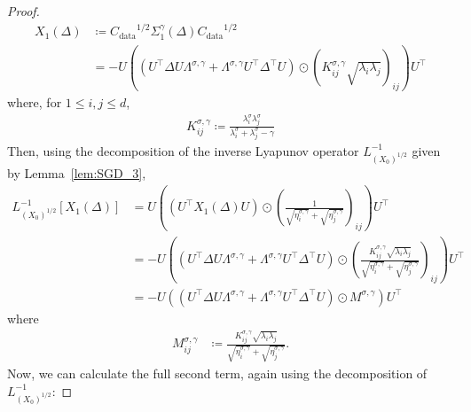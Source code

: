 \documentclass[11pt]{article}
\newcommand{\eqdef}{\coloneqq}
\newcommand{\EE}{\mathbb{E}}
\begin{document}
\begin{proof}
\begin{align*}
X_1(\Delta) &\eqdef{C_\mathrm{data}}^{1/2} \Sigma^\gamma_{1} (\Delta) {C_\mathrm{data}}^{1/2} \\ &= - U \left( \left( U^{\top} \Delta U \Lambda^{\sigma, \gamma} + \Lambda^{\sigma, \gamma} U^{\top} \Delta^\top U \right) \odot \left( K^{\sigma, \gamma}_{ij} \sqrt{\lambda_i \lambda_j} \right)_{ij} \right) U^\top
\end{align*}
where, for $1 \leq i,j \leq d$,
\begin{align} \label{eq:K_ij}
    K^{\sigma, \gamma}_{ij} \eqdef \frac{\lambda^\sigma_i \lambda^\sigma_j}{\lambda^\sigma_i + \lambda^\sigma_j - \gamma}
\end{align}
Then, using the decomposition of the inverse Lyapunov operator $L_{(X_0)^{1/2}}^{-1}$ given by Lemma~\ref{lem:SGD_3},
\begin{align*}
    L_{(X_0)^{1/2}}^{-1}[X_1(\Delta)] 
    &= U \left( (U^\top X_1(\Delta) U) \odot \left(\frac{1}{ \sqrt{\eta^{\sigma, \gamma}_i} + \sqrt{\eta^{\sigma, \gamma}_j} }\right)_{ij}\right) U^\top \\
    &= - U \left( \left(  U^{\top} \Delta U \Lambda^{\sigma, \gamma} + \Lambda^{\sigma, \gamma} U^{\top} \Delta^\top U \right) 
    \odot \left(\frac{K^{\sigma, \gamma}_{ij} \sqrt{\lambda_i \lambda_j}}{ \sqrt{\eta^{\sigma, \gamma}_i} + \sqrt{\eta^{\sigma, \gamma}_j} }\right)_{ij}\right) U^\top \\
    &= - U \left( \left(  U^{\top} \Delta U \Lambda^{\sigma, \gamma} + \Lambda^{\sigma, \gamma} U^{\top} \Delta^\top U \right) 
    \odot M^{\sigma, \gamma} \right) U^\top 
\end{align*}
where 
\begin{align*}
    M^{\sigma, \gamma}_{ij} &\eqdef \frac{K^{\sigma, \gamma}_{ij} \sqrt{\lambda_i \lambda_j}}{ \sqrt{\eta^{\sigma, \gamma}_i} + \sqrt{\eta^{\sigma, \gamma}_j} } .
\end{align*}
Now, we can calculate the full second term, again using the decomposition of $L_{(X_0)^{1/2}}^{-1}$:

\end{proof}
\end{document}
